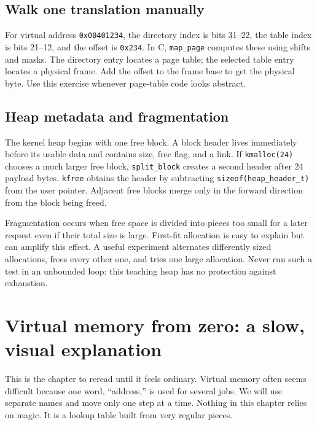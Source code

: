 \section{Walk one translation manually}
For virtual address \texttt{0x00401234}, the directory index is bits 31--22, the table index is bits 21--12, and the offset is \texttt{0x234}. In C, \texttt{map\_page} computes these using shifts and masks. The directory entry locates a page table; the selected table entry locates a physical frame. Add the offset to the frame base to get the physical byte. Use this exercise whenever page-table code looks abstract.

\section{Heap metadata and fragmentation}
The kernel heap begins with one free block. A block header lives immediately before its usable data and contains size, free flag, and a link. If \texttt{kmalloc(24)} chooses a much larger free block, \texttt{split\_block} creates a second header after 24 payload bytes. \texttt{kfree} obtains the header by subtracting \texttt{sizeof(heap\_header\_t)} from the user pointer. Adjacent free blocks merge only in the forward direction from the block being freed.

Fragmentation occurs when free space is divided into pieces too small for a later request even if their total size is large. First-fit allocation is easy to explain but can amplify this effect. A useful experiment alternates differently sized allocations, frees every other one, and tries one large allocation. Never run such a test in an unbounded loop: this teaching heap has no protection against exhaustion.


\chapter{Virtual memory from zero: a slow, visual explanation}
This is the chapter to reread until it feels ordinary. Virtual memory often seems difficult because one word, ``address,'' is used for several jobs. We will use separate names and move only one step at a time. Nothing in this chapter relies on magic. It is a lookup table built from very regular pieces.


